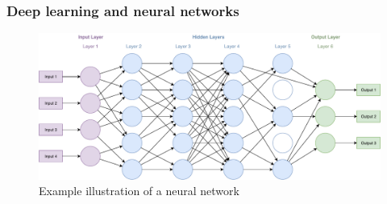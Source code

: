 \documentclass[
	a4paper,
	pagesize,
	pdftex,
	12pt,
	twoside, %
	BCOR=5mm, %
	ngerman,
	fleqn,
	final,
	]{scrartcl}
\begin{document}
\subsubsection{Deep learning and neural networks}\label{Deep-Learning}
\begin{figure}[ht]
	\centering
	\includegraphics[width=\linewidth]{img/NeuralNetwork}
	\caption{Example illustration of a neural network}
	\label{fig:neuralnetwork}
\end{figure}
\end{document}
